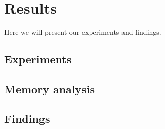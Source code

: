 \section{Results}
Here we will present our experiments and findings. 
\subsection{Experiments}
\subsection{Memory analysis}
\subsection{Findings}
